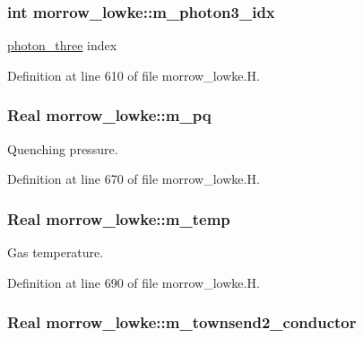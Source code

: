 \subsubsection[{\texorpdfstring{m\+\_\+photon3\+\_\+idx}{m_photon3_idx}}]{\setlength{\rightskip}{0pt plus 5cm}int morrow\+\_\+lowke\+::m\+\_\+photon3\+\_\+idx}\hypertarget{classmorrow__lowke_af0d19f1bab5cc533a71f4e70d0c515f0}{}\label{classmorrow__lowke_af0d19f1bab5cc533a71f4e70d0c515f0}


\hyperlink{classmorrow__lowke_1_1photon__three}{photon\+\_\+three} index 



Definition at line 610 of file morrow\+\_\+lowke.\+H.

\subsubsection[{\texorpdfstring{m\+\_\+pq}{m_pq}}]{\setlength{\rightskip}{0pt plus 5cm}Real morrow\+\_\+lowke\+::m\+\_\+pq}\hypertarget{classmorrow__lowke_a84d13ef230b19cc931381aa43d93eac3}{}\label{classmorrow__lowke_a84d13ef230b19cc931381aa43d93eac3}


Quenching pressure. 



Definition at line 670 of file morrow\+\_\+lowke.\+H.

\subsubsection[{\texorpdfstring{m\+\_\+temp}{m_temp}}]{\setlength{\rightskip}{0pt plus 5cm}Real morrow\+\_\+lowke\+::m\+\_\+temp}\hypertarget{classmorrow__lowke_ad2afd8205b3c323cb17427016a802186}{}\label{classmorrow__lowke_ad2afd8205b3c323cb17427016a802186}


Gas temperature. 



Definition at line 690 of file morrow\+\_\+lowke.\+H.

\subsubsection[{\texorpdfstring{m\+\_\+townsend2\+\_\+conductor}{m_townsend2_conductor}}]{\setlength{\rightskip}{0pt plus 5cm}Real morrow\+\_\+lowke\+::m\+\_\+townsend2\+\_\+conductor}\hypertarget{classmorrow__lowke_adac34db9273ce7560ad71e968dadec0a}{}\label{classmorrow__lowke_adac34db9273ce7560ad71e968dadec0a}


